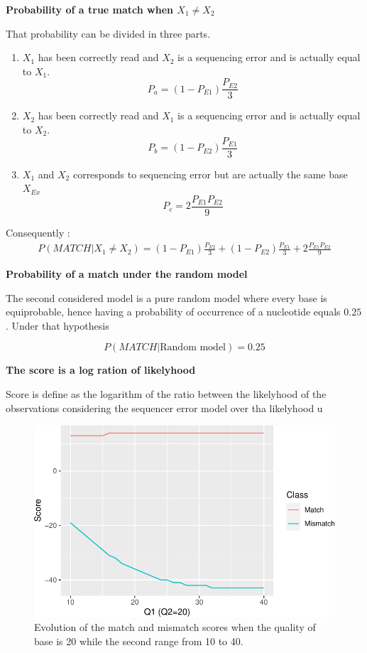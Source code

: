 \documentclass[
  letterpaper,
  DIV=11,
  numbers=noendperiod]{scrreprt}
\providecommand{\tightlist}{%
  \setlength{\itemsep}{0pt}\setlength{\parskip}{0pt}}\usepackage{longtable,booktabs,array}
\begin{document}
\textbf{Probability of a true match when \(X_1 \neq X_2\)}

That probability can be divided in three parts.

\begin{enumerate}
\def\labelenumi{\alph{enumi}.}
\tightlist
\item
  \(X_1\) has been correctly read and \(X_2\) is a sequencing error and
  is actually equal to \(X_1\). \[
  P_a =  (1-P_{E1})\frac{P_{E2}}{3}
  \]
\item
  \(X_2\) has been correctly read and \(X_1\) is a sequencing error and
  is actually equal to \(X_2\). \[
  P_b =  (1-P_{E2})\frac{P_{E1}}{3}
  \]
\item
  \(X_1\) and \(X_2\) corresponds to sequencing error but are actually
  the same base \(X_{Ex}\) \[
  P_c = 2\frac{P_{E1} P_{E2}}{9}
  \]
\end{enumerate}

Consequently : \[
\begin{aligned}
P(MATCH | X_1 \neq X_2) =  (1-P_{E1})\frac{P_{E2}}{3} +  (1-P_{E2})\frac{P_{E1}}{3} + 2\frac{P_{E1} P_{E2}}{9}
\end{aligned}
\]

\textbf{Probability of a match under the random model}

The second considered model is a pure random model where every base is
equiprobable, hence having a probability of occurrence of a nucleotide
equals \(0.25\). Under that hypothesis

\[
P(MATCH | \text{Random model}) = 0.25
\]

\textbf{The score is a log ration of likelyhood}

Score is define as the logarithm of the ratio between the likelyhood of
the observations considering the sequencer error model over tha
likelyhood u

\begin{figure}

{\centering \includegraphics{./comm_computation_files/figure-pdf/unnamed-chunk-1-1.pdf}

}

\caption{Evolution of the match and mismatch scores when the quality of
base is 20 while the second range from 10 to 40.}

\end{figure}
\end{document}

